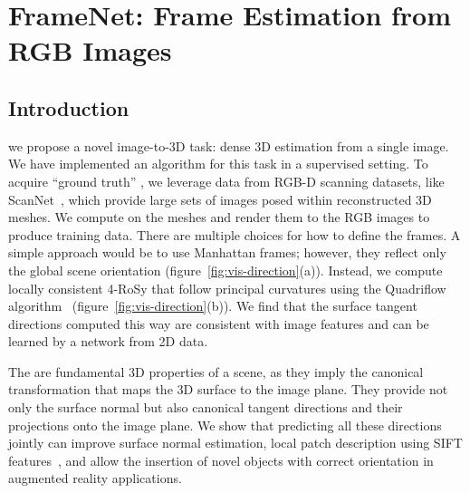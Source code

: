 \section{FrameNet: Frame Estimation from RGB Images}
\label{sec:framenet}
\subsection{Introduction}
we propose a novel image-to-3D task: dense 3D \cframe{} estimation from a single image. We have implemented an algorithm for this task in a supervised setting.   To acquire ``ground truth'' \cframe{}, we leverage data from RGB-D scanning datasets, like ScanNet~\cite{dai2017scannet}, which provide large sets of images posed within reconstructed 3D meshes.  
We compute \cframe{} on the meshes and render them to the RGB images to produce training data.  There are multiple choices for how to define the frames.  A simple approach would be to use Manhattan frames; however, they
reflect only the global scene orientation (figure~\ref{fig:vis-direction}(a)).   Instead, we compute locally consistent 4-RoSy \cframe{} that follow principal curvatures using the Quadriflow algorithm~\cite{huang2018quadriflow} (figure~\ref{fig:vis-direction}(b)).  We find that the surface tangent directions computed this way are consistent with image features and can be learned by a network from 2D data.

The \cframes{} are fundamental 3D properties of a scene, as they imply the canonical transformation that maps the 3D surface to the image plane.  They provide not only the surface normal but also canonical tangent directions and their projections onto the image plane.  We show that predicting all these directions jointly can improve surface normal estimation, local patch description using SIFT features~\cite{lowe2004distinctive}, and allow the insertion of novel objects with correct orientation in augmented reality applications.


